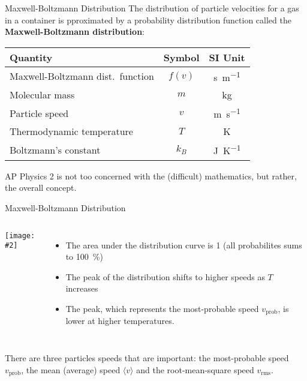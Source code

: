 \documentclass[12pt,aspectratio=169]{beamer}
\newcommand{\pic}[2]{
  \begin{center}\texttt{[image: \#2]}\end{center}
}
\newcommand{\eq}[2]{\vspace{#1}{\Large\begin{displaymath}#2\end{displaymath}}}
\begin{document}
\begin{frame}{Maxwell-Boltzmann Distribution}
  The distribution of particle velocities for a gas in a container is
  pproximated by a probability distribution function called the
  \textbf{Maxwell-Boltzmann distribution}:

  \eq{-.2in}{
    f(v)=4\pi\left[\frac{m}{2\pi k_BT}\right]^{\frac32}v^2
    \exp\left[-\frac{mv^2}{2k_BT}\right]
  }

  \begin{center}
    \begin{tabular}{l|c|c}
      \rowcolor{pink}
      \textbf{Quantity} & \textbf{Symbol} & \textbf{SI Unit} \\ \hline
      Maxwell-Boltzmann dist.\ function & $f(v)$ &\si{\second\per\metre}\\
      Molecular mass            & $m$        & \si{\kilo\gram} \\
      Particle speed            & $v$        & \si{\metre\per\second} \\
      Thermodynamic temperature & $T$        & \si{\kelvin} \\
      Boltzmann's constant      & $k_B$      & \si{\joule\per\kelvin}
    \end{tabular}
  \end{center}
  AP Physics 2 is not too concerned with the (difficult) mathematics,
  but rather, the overall concept.
\end{frame}



\begin{frame}{Maxwell-Boltzmann Distribution}
  \vspace{.15in}\begin{columns}
    \pic{1.05}{maxwell-boltzmann}
    
    \begin{itemize}
    \item The area under the distribution curve is 1 (all probabilites sums to
      \SI{100}{\percent})
    \item The peak of the distribution shifts to higher speeds as $T$ increases
    \item The peak, which represents the most-probable speed $v_\text{prob}$,
      is lower at higher temperatures.
    \end{itemize}
  \end{columns}
  \vspace{.2in}There are three particles speeds that are important: the
  most-probable speed $v_\text{prob}$, the mean (average) speed
  $\langle v \rangle$ and the root-mean-square speed $v_\text{rms}$.
\end{frame}
\end{document}

